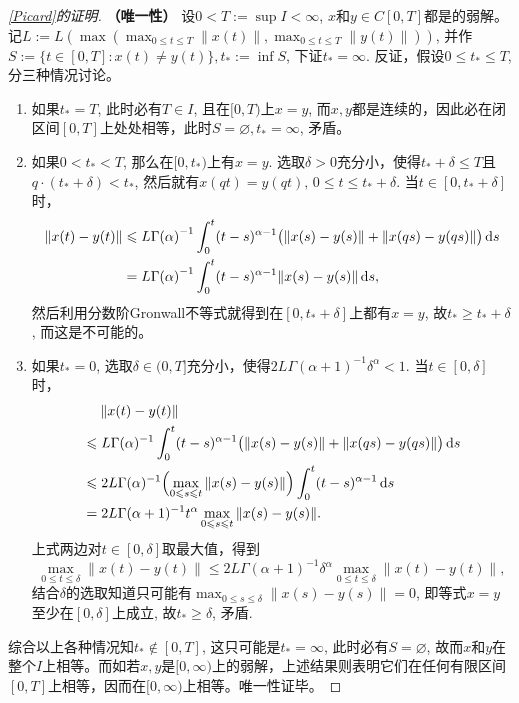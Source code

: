 \begin{proof}[\cref{Picard}的证明]
    \textbf{（唯一性）} 设$0<T:=\sup I<\infty$, $x$和$y\in C[0,T]$都是\mainEquation 的弱解。记$L:=L\left(\max\left(\max_{0\leqslant t\leqslant T}\|x(t)\|,\right.\right.\allowbreak\left.\left.\max_{0\leqslant t\leqslant T}\|y(t)\|\right)\right)$, 并作$S:=\{t\in [0,T]\colon x(t)\neq y(t)\},t_*:=\inf S$, 下证$t_*=\infty$. 反证，假设$0\leqslant t_*\leqslant T$, 分三种情况讨论。
    \begin{enumerate}
        \item 如果$t_*=T$, 此时必有$T\in I$, 且在$[0,T)$上$x=y$, 而$x,y$都是连续的，因此必在闭区间$[0,T]$上处处相等，此时$S=\varnothing,t_*=\infty$, 矛盾。
        \item 如果$0<t_*<T$, 那么在$[0,t_*)$上有$x=y$. 选取$\delta>0$充分小，使得$t_*+\delta\leqslant T$且$q\cdot (t_*+\delta)<t_*$, 然后就有$x(qt)=y(qt),\,0\leqslant t\leqslant t_*+\delta$. 当$t\in \left[0,t_*+\delta\right]$时，
        \begin{align*}
            \left\| x(t) - y(t) \right\| &\leqslant {L}{\Gamma(\alpha)}^{-1} \int_0^t (t-s)^{\alpha-1} \bigl(\|x(s)-y(s)\|+\|x(qs)-y(qs)\|\bigr) \mathop{}\!\mathrm{d} s\\
            &={L}{\Gamma(\alpha)}^{-1} \int_0^t (t-s)^{\alpha-1} \|x(s)-y(s)\| \mathop{}\!\mathrm{d} s,
        \end{align*}
        然后利用分数阶Gronwall不等式\cite{mild}就得到在$\left[0,t_*+\delta\right]$上都有$x=y$, 故$t_*\geqslant t_*+\delta$, 而这是不可能的。
        \item 如果$t_*=0$, 选取$\delta\in (0,T]$充分小，使得$2L\Gamma(\alpha+1)^{-1}\delta^\alpha<1$. 当$t\in[0,\delta]$时，
        \begin{align*}
            &\relphantom{\leqslant}\left\| x(t) - y(t) \right\| \\& \leqslant L\Gamma(\alpha)^{-1}\int_0^t (t-s)^{\alpha-1} \bigl(\|x(s)-y(s)\|+\|x(qs)-y(qs)\|\bigr) \differential s\\
            &\leqslant 2L\Gamma(\alpha)^{-1} \Bigl(\max_{0\leqslant s\leqslant t}\|x(s)-y(s)\|\Bigr) \int_0^t (t-s)^{\alpha-1} \differential s\\
            &=2L\Gamma(\alpha+1)^{-1}t^\alpha \max_{0\leqslant s\leqslant t}\|x(s)-y(s)\|.
        \end{align*}
        上式两边对$t\in[0,\delta]$取最大值，得到
        \begin{equation*}
            \max_{0\leqslant t\leqslant \delta}\|x(t)-y(t)\|\leqslant 2L\Gamma(\alpha+1)^{-1}\delta^\alpha \max_{0\leqslant t\leqslant \delta}\|x(t)-y(t)\|,
        \end{equation*}
        结合$\delta$的选取知道只可能有$\max_{0\leqslant s\leqslant \delta}\|x(s)-y(s)\|=0$, 即等式$x=y$至少在$[0,\delta]$上成立, 故$t_*\geqslant \delta$, 矛盾.
    \end{enumerate}
    综合以上各种情况知$t_*\notin [0,T]$, 这只可能是$t_*=\infty$, 此时必有$S=\varnothing$, 故而$x$和$y$在整个$I$上相等。而如若$x,y$是$[0,\infty)$上\mainEquation 的弱解，上述结果则表明它们在任何有限区间$[0,T]$上相等，因而在$[0,\infty)$上相等。唯一性证毕。
\end{proof}

